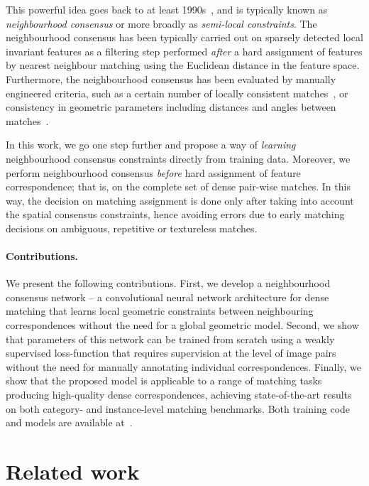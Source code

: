 \documentclass{article}
\begin{document}
This powerful idea goes back to at least 1990s~\cite{zhang1995robust,schmid1997local,Schaffalitzky02a,Sivic03,bian2017gms}, and is typically known as \emph{neighbourhood consensus} or more broadly as \emph{semi-local constraints}. The neighbourhood consensus has been typically carried out on sparsely detected local invariant features as a filtering step performed \emph{after} a hard assignment of features by nearest neighbour matching using the Euclidean distance in the feature space.
Furthermore, the neighbourhood consensus has been evaluated by  manually engineered criteria,
such as a certain number of locally consistent matches~\cite{Schaffalitzky02a,Sivic03,bian2017gms}, or consistency in geometric parameters including distances and angles between matches~\cite{zhang1995robust,schmid1997local}.

In this work, we go one step further and propose a way of \emph{learning} neighbourhood consensus constraints directly from training data. Moreover, we perform neighbourhood consensus \emph{before} hard assignment of feature correspondence; that is, on the complete set of dense pair-wise matches. In this way, the decision on matching assignment is done only after taking into account the spatial consensus constraints, hence avoiding errors due to early matching decisions on ambiguous, repetitive or textureless matches.

\paragraph{Contributions.} We present the following contributions. First, we develop a neighbourhood consensus network -- a convolutional neural network architecture for dense matching that learns local geometric constraints between neighbouring correspondences without the need for a global geometric model. Second, we show that parameters of this network can be trained from scratch using a weakly supervised loss-function that requires supervision at the level of image pairs without the need for manually annotating individual correspondences.  Finally, we show that the proposed model is applicable to a range of matching tasks producing high-quality dense correspondences, achieving state-of-the-art results on both category- and instance-level matching benchmarks. Both training code and models are available at~\cite{website}.

\section{Related work}
\end{document}
